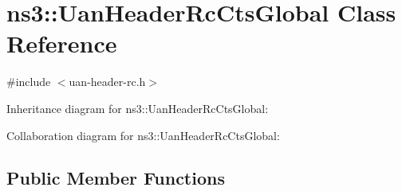 \hypertarget{classns3_1_1UanHeaderRcCtsGlobal}{}\section{ns3\+:\+:Uan\+Header\+Rc\+Cts\+Global Class Reference}
\label{classns3_1_1UanHeaderRcCtsGlobal}


{\ttfamily \#include $<$uan-\/header-\/rc.\+h$>$}



Inheritance diagram for ns3\+:\+:Uan\+Header\+Rc\+Cts\+Global\+:


Collaboration diagram for ns3\+:\+:Uan\+Header\+Rc\+Cts\+Global\+:
\subsection*{Public Member Functions}
